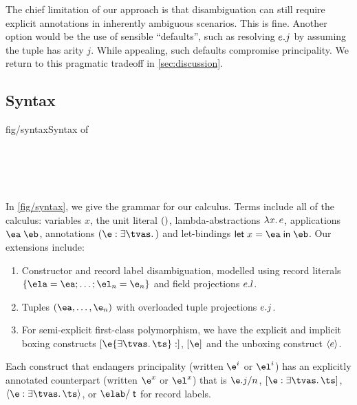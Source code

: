 \documentclass[acmsmall,screen,nonacm,review]{acmart}
\begin{document}

The chief limitation of our approach is that disambiguation can still
require explicit annotations in inherently ambiguous scenarios.  This is
fine. Another option would be the use of sensible ``defaults'', such as
resolving $e.j$ by assuming the tuple has arity $j$. While
appealing, such defaults compromise principality. We return to this
pragmatic tradeoff in \cref{sec:discussion}.

\subsection{Syntax}

\begin{bnffig}{fig/syntax}{Syntax of \OML}
\\
\\[1ex]
\entry[Types]{\t}{
   \tv \and
   1 \and
   \tya \to \tyb \and
   \tys \T \and
   \Pi \iton \ti \and
   \tpoly \ts
}\\
\\
\\
\end{bnffig}


In \cref {fig/syntax}, we give the grammar for our calculus. Terms include
all of the \ML calculus: variables $x$, the unit literal $()$,
lambda-abstractions $\lambda x. \, e$, applications $\eapp \eone \etwo$,
annotations $\eannot \e \tvs \t$ and let-bindings $\elet x \eone \etwo$.
Our extensions include:
\begin{enumerate}
\item
  Constructor and record label disambiguation, modelled using record
  literals $\erecord { \ela = \eone; \ldots; \el_n = \en }$ and field
  projections $e.l$.

\item
  Tuples $(\eone, \ldots, \en)$ with overloaded tuple projections
  $e.j$.

\item
  For semi-explicit first-class polymorphism, we have the explicit and
    implicit boxing constructs
    $\expoly \e {\exi \tvs \ts}$, $\epoly \e$  and the unboxing construct $\einst e$.

\end{enumerate}
Each construct that endangers principality (written $\e^i$ or $\el^i$) has an
explicitly annotated counterpart (written $\e^x$ or $\el^x$) that is
$\eproj [n] \e j$, $\epoly [\exi \tvs \ts]
\e$, $\einst [\exi \tvs \ts] \e$, or $\elab / \T$ for record labels.
\end{document}
